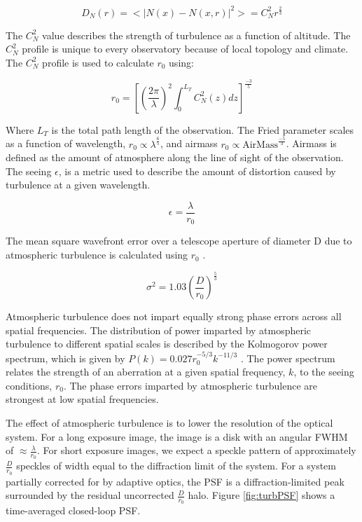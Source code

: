 \begin{equation}
    D_N(r)=<|N(x)-N(x,r)|^2>=C_N^2r^{\frac{2}{3}}
\end{equation}

The $C_N^2$ value describes the strength of turbulence as a function of altitude. The $C_N^2$ profile is unique to every observatory because of local topology and climate. The $C_N^2$ profile is used to calculate $r_0$ using:

\begin{equation}
    r_0=[(\frac{2\pi}{\lambda})^2 \int_0^{L_T} C_N^2(z)dz]^{\frac{-3}{5}}
\end{equation}
 
 Where $L_T$ is the total path length of the observation. The Fried parameter scales as a function of wavelength, $r_0 \propto \lambda^{\frac{6}{5}}$, and airmass $r_0 \propto \text{AirMass}^{\frac{-5}{3}}$. Airmass is defined as the amount of atmosphere along the line of sight of the observation. The seeing $\epsilon$, is a metric used to describe the amount of distortion caused by turbulence at a given wavelength.
 
 \begin{equation}
     \epsilon=\frac{\lambda}{r_0}
 \end{equation}
 
 The mean square wavefront error over a telescope aperture of diameter D due to atmospheric turbulence is calculated using $r_0$ \citep{noll1976zernike}.
 
 \begin{equation}
     \sigma^2=1.03(\frac{D}{r_0})^{\frac{5}{3}}
 \end{equation}


Atmospheric turbulence does not impart equally strong phase errors across all spatial frequencies. The distribution of power imparted by atmospheric turbulence to different spatial scales is described by the Kolmogorov power spectrum, which is given by $P(k)=0.027r_0^{-5/3}k^{-11/3}$  \citep{rampy2012production}. The power spectrum relates the strength of an aberration at a given spatial frequency, $k$, to the seeing conditions, $r_0$. The phase errors imparted by atmospheric turbulence are strongest at low spatial frequencies.

The effect of atmospheric turbulence is to lower the resolution of the optical system. For a long exposure image, the image is a disk with an angular FWHM of $\approx \frac{\lambda}{r_0 }$. For short exposure images, we expect a speckle pattern of approximately $\frac{D}{r_0}$ speckles of width equal to the diffraction limit of the system. For a system partially corrected for by adaptive optics, the PSF is a diffraction-limited peak surrounded by the residual uncorrected $\frac{D}{r_0}$ halo. Figure \ref{fig:turbPSF} shows a time-averaged closed-loop PSF.


